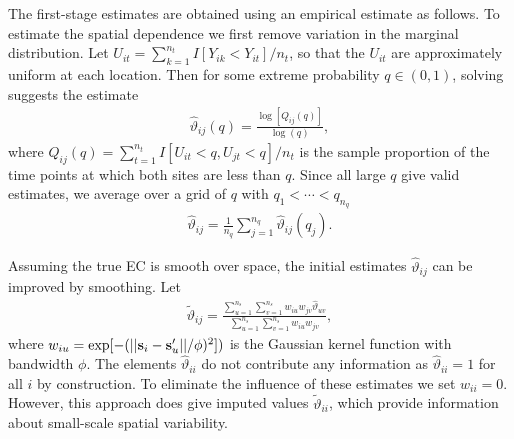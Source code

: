 The first-stage estimates are obtained using an empirical estimate as follows.
To estimate the spatial dependence we first remove variation in the marginal distribution.
Let $U_{it} = \sum_{k=1}^{n_t} I[Y_{ik}<Y_{it}]/n_t$, so that the $U_{it}$ are approximately uniform at each location.
Then for some extreme probability $q\in(0,1)$, solving  suggests the estimate
\begin{align}\label{ebeq:EChat0}
   {\hat \vartheta}_{ij}(q) = \frac{\log[Q_{ij}(q)]}{\log(q)},
\end{align}
where $Q_{ij}(q) = \sum_{t=1}^{n_t}I[U_{it}<q,U_{jt}<q]/n_t$ is the sample proportion of the time points at which both sites are less than $q$.
Since all large $q$ give valid estimates, we average over a grid of $q$ with $q_1< \cdots <q_{n_q}$
\begin{align} \label{ebeq:EChat1}
{\hat \vartheta}_{ij} = \frac{1}{n_q}\sum_{j=1}^{n_q}{\hat \vartheta}_{ij}(q_j).
\end{align}

Assuming the true EC is smooth over space, the initial estimates ${\hat \vartheta}_{ij}$ can be improved by smoothing.
Let
\begin{align} \label{ebeq:EChat2}
  {\tilde \vartheta}_{ij} = \frac{\sum_{u=1}^{n_s}\sum_{v=1}^{n_s} w_{iu}w_{jv}{\hat \vartheta}_{uv}}
  {\sum_{u=1}^{n_s}\sum_{v=1}^{n_s} w_{iu}w_{jv}},
\end{align}
where $w_{iu} = \exp[-(||\mathbf{s}_i-\mathbf{s}_u'||/\phi)^2])$ is the Gaussian kernel function with bandwidth $\phi$.
The elements ${\hat \vartheta}_{ii}$ do not contribute any information as ${\hat \vartheta}_{ii}=1$ for all $i$ by construction.
To eliminate the influence of these estimates we set $w_{ii}=0$.
However, this approach does give imputed values ${\tilde \vartheta}_{ii}$, which provide information about small-scale spatial variability.

